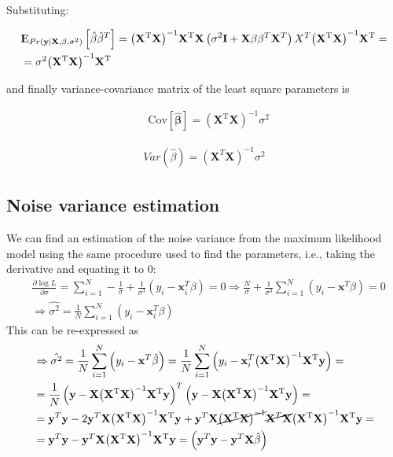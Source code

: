 \documentclass[12pt, letterpaper]{article}
\theoremstyle{definition}
\newcommand{\E}{{\rm I\kern-.3em E}}
\newcommand{\Cov}{\mathrm{Cov}}
\newcommand{\X}{\mathrm{\mathbf{X}}}
\newcommand{\y}{\mathbf{y}}
\newcommand{\x}{\mathbf{x}}
\newcommand{\inv}{\mathrm{\left( \X^T\X\right)^{-1}}}
\newcommand{\HM}{\mathrm{\inv\X^T}}
\newcommand{\hb}{\mathrm{\hat{\mathbf{\beta}}}}
\begin{document}
Substituting:

\begin{equation}
\begin{aligned}
&\E_{Pr(\y|\X,\beta, \sigma^2)}\left[ \hb\hb^T\right] = \HM \X\left(\sigma^2 \mathbf{I} +\X\beta \beta^T\X^T\right)X^T \HM   = \\
 &=\sigma^2 \HM 
\end{aligned}
\end{equation}

and finally variance-covariance matrix of the least square parameters is 

\begin{equation}
\begin{aligned}
&\Cov\left[ \hb\right]=  \inv  \sigma^2
\end{aligned}
\end{equation}
 
\begin{align}
Var(\hat{\beta}) = (\X^T\X)^{-1} \sigma^2
\end{align}

\subsection{Noise variance estimation}
We can find an estimation of the noise variance from the maximum likelihood model using the same procedure used to find the parameters, i.e., taking the derivative and equating it to $0$:
\begin{equation}
\begin{aligned}
\label{varErr}
&\frac{\partial \log L}{\partial \sigma} = \sum_{i=1}^N-\frac{1}{\sigma} +\frac{1}{\sigma^3} \left(y_i - \x_i^T\beta\right) = 0 \Rightarrow \frac{N}{\sigma} +\frac{1}{\sigma^3}  \sum_{i=1}^N\left(y_i - \x^T\beta\right) = 0\\
&\Rightarrow \hat{\sigma^2} = \frac{1}{N}\sum_{i=1}^N\left(y_i - \x_i^T\beta\right) 
\end{aligned}
\end{equation}
This can be re-expressed as
\begin{equation}
\begin{aligned}
&\Rightarrow \hat{\sigma^2} = \frac{1}{N}\sum_{i=1}^N\left(y_i - \x^T\hb\right)  = \frac{1}{N}\sum_{i=1}^N\left(y_i - \x_i^T\HM\y\right) = \\
&= \frac{1}{N}\left(\y - \X\HM\y\right)^T\left(\y - \X\HM\y\right) = \\
&=\y^T\y  - 2 \y^T  \X\HM\y + \y^T \X \cancel{\inv} \cancel{\X^T \X}\HM\y = \\
&=\y^T\y  - \y^T  \X\HM\y  = \left(\y^T\y - \y^T\X\hb \right)
\end{aligned}
\end{equation}
\end{document}
